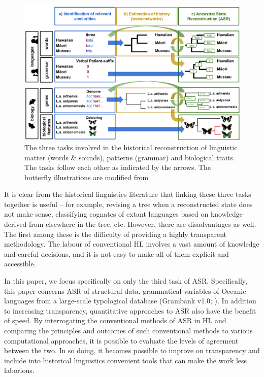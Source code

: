 \documentclass[12pt,letterpaper]{article}
\begin{document}
\begin{figure}
\centering
\includegraphics[width=22cm]{illustrations/ASR_HL_explainer_ill.png}
\caption{The three tasks involved in the historical reconstruction of linguistic matter (words \& sounds), patterns (grammar) and biological traits. The tasks follow each other as indicated by the arrows. The butterfly illustrations are modified from \citet{savage2009single}}
\label{fig:HL_tasks}
\end{figure}

It is clear from the historical linguistics literature that linking these three tasks together is useful -- for example, revising a tree when a reconstructed state does not make sense, classifying cognates of extant languages based on knowledge derived from elsewhere in the tree, etc. However, there are disadvantages as well. The first among these is the difficulty of providing a highly transparent methodology. The labour of conventional HL involves a vast amount of knowledge and careful decisions, and it is not easy to make all of them explicit and accessible. 

In this paper, we focus specifically on only the third task of ASR. Specifically, this paper concerns ASR of structural data, grammatical variables of Oceanic languages from a large-scale typological database (Grambank v1.0; \citealt{grambank_release}). In addition to increasing transparency, quantitative approaches to ASR also have the benefit of speed. By interrogating the conventional methods of ASR in HL and comparing the principles and outcomes of such conventional methods to various computational approaches, it is possible to evaluate the levels of agreement between the two. In so doing, it becomes possible to improve on transparency and include into historical linguistics convenient tools that can make the work less laborious.
\end{document}
